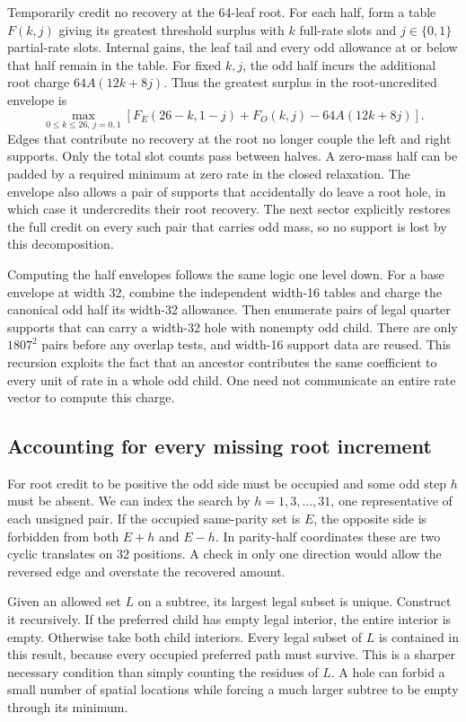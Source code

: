 \documentclass[12pt,letterpaper]{article}
\begin{document}
Temporarily credit no recovery at the 64-leaf root. For each half, form a table \(F(k,j)\) giving its greatest threshold surplus with \(k\) full-rate slots and \(j\in\{0,1\}\) partial-rate slots. Internal gains, the leaf tail and every odd allowance at or below that half remain in the table. For fixed \(k,j\), the odd half incurs the additional root charge \(64 A(12k+8j)\). Thus the greatest surplus in the root-uncredited envelope is
\[
 \max_{0\le k\le26,\,j=0,1}
 \left[F_E(26-k,1-j)+F_O(k,j)-64A(12k+8j)\right].
\]
Edges that contribute no recovery at the root no longer couple the left and right supports. Only the total slot counts pass between halves. A zero-mass half can be padded by a required minimum at zero rate in the closed relaxation. The envelope also allows a pair of supports that accidentally do leave a root hole, in which case it undercredits their root recovery. The next sector explicitly restores the full credit on every such pair that carries odd mass, so no support is lost by this decomposition.

Computing the half envelopes follows the same logic one level down. For a base envelope at width 32, combine the independent width-16 tables and charge the canonical odd half its width-32 allowance. Then enumerate pairs of legal quarter supports that can carry a width-32 hole with nonempty odd child. There are only \(1807^2\) pairs before any overlap tests, and width-16 support data are reused. This recursion exploits the fact that an ancestor contributes the same coefficient to every unit of rate in a whole odd child. One need not communicate an entire rate vector to compute this charge.

\subsection{Accounting for every missing root increment}

For root credit to be positive the odd side must be occupied and some odd step \(h\) must be absent. We can index the search by \(h=1,3,\ldots,31\), one representative of each unsigned pair. If the occupied same-parity set is \(E\), the opposite side is forbidden from both \(E+h\) and \(E-h\). In parity-half coordinates these are two cyclic translates on 32 positions. A check in only one direction would allow the reversed edge and overstate the recovered amount.

Given an allowed set \(L\) on a subtree, its largest legal subset is unique. Construct it recursively. If the preferred child has empty legal interior, the entire interior is empty. Otherwise take both child interiors. Every legal subset of \(L\) is contained in this result, because every occupied preferred path must survive. This is a sharper necessary condition than simply counting the residues of \(L\). A hole can forbid a small number of spatial locations while forcing a much larger subtree to be empty through its minimum.
\end{document}
